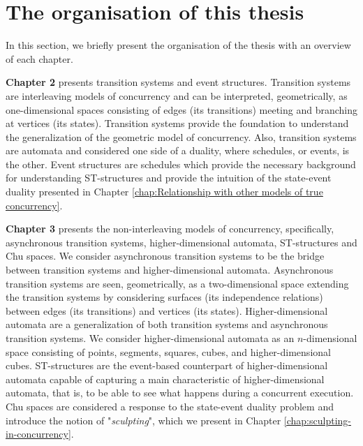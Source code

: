 \section{The organisation of this thesis}
In this section, we briefly present the organisation of the thesis with an overview of each chapter.

\textbf{Chapter 2} presents transition systems and event structures. Transition systems are interleaving models of concurrency and can be interpreted, geometrically, as one-dimensional spaces consisting of edges (its transitions) meeting and branching at vertices (its states). Transition systems provide the foundation to understand the generalization of the geometric model of concurrency. Also, transition systems are automata and considered one side of a duality, where schedules, or events, is the other. Event structures are schedules which provide the necessary background for understanding ST-structures and provide the intuition of the state-event duality presented in Chapter \ref{chap:Relationship with other models of true concurrency}. 

\textbf{Chapter 3} presents the non-interleaving models of concurrency, specifically, asynchronous transition systems, higher-dimensional automata, ST-structures and Chu spaces. We consider asynchronous transition systems to be the bridge between transition systems and higher-dimensional automata. Asynchronous transition systems are seen, geometrically, as a two-dimensional space extending the transition systems by considering surfaces (its independence relations) between edges (its transitions) and vertices (its states). Higher-dimensional automata are a generalization of both transition systems and asynchronous transition systems. We consider higher-dimensional automata as an $n$-dimensional space consisting of points, segments, squares, cubes, and higher-dimensional cubes. ST-structures are the event-based counterpart of higher-dimensional automata capable of capturing a main characteristic of higher-dimensional automata, that is, to be able to see what happens during a concurrent execution. Chu spaces are considered a response to the state-event duality problem and introduce the notion of "\emph{sculpting}", which we present in Chapter \ref{chap:sculpting-in-concurrency}.

